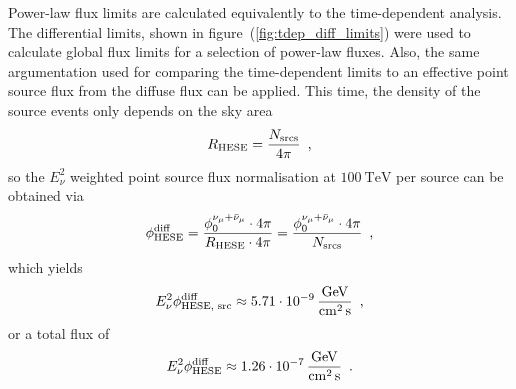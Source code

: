 Power-law flux limits are calculated equivalently to the time-dependent analysis.
The differential limits, shown in figure~(\ref{fig:tdep_diff_limits}) were used to calculate global flux limits for a selection of power-law fluxes.
Also, the same argumentation used for comparing the time-dependent limits to an effective point source flux from the diffuse flux can be applied.
This time, the density of the source events only depends on the sky area
\begin{equation}
  R_\text{HESE} = \frac{N_\text{srcs}}{4\pi}
  \enspace\text{,}
\end{equation}
so the $E_\nu^2$ weighted point source flux normalisation at $\SI{100}{\TeV}$ per source can be obtained via
\begin{equation}
  \phi_\text{HESE}^\text{diff}
  = \frac{\phi_0^{\nu_\mu+\bar{\nu}_\mu} \cdot 4\pi}
         {R_\text{HESE} \cdot 4\pi}
  = \frac{\phi_0^{\nu_\mu+\bar{\nu}_\mu} \cdot 4\pi}
         {N_\text{srcs}}
  \enspace\text{,}
\end{equation}
which yields
\begin{equation}
  E_\nu^2 \phi_\text{HESE, src}^\text{diff}
    \approx \SI{5.71e-9}{\GeV\per\cm\squared\per\second}
  \mcomma
\end{equation}
or a total flux of
\begin{equation}
  E_\nu^2 \phi_\text{HESE}^\text{diff}
    \approx \SI{1.26e-7}{\GeV\per\cm\squared\per\second}
  \mperiod
\end{equation}

